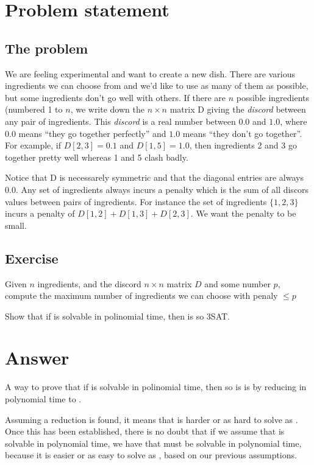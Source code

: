 \section*{Problem statement}
\subsection*{The \exc{} problem}
We are feeling experimental and want to create a new dish. There are various ingredients we can choose from and we'd like to use as many of them as possible, but some ingredients don't go well with others. If there are $n$ possible ingredients (numbered 1 to $n$, we write down the $n\times n$ matrix D giving the \textit{discord} between any pair of ingredients. This \textit{discord} is a real number between $0.0$ and $1.0$, where $0.0$ means ``they go together perfectly'' and $1.0$ means ``they don't go together''. For example, if $D[2,3] = 0.1$ and $D[1,5] = 1.0$, then ingredients 2 and 3 go together pretty well whereas 1  and 5 clash badly.

Notice that D is necessarely symmetric and that the diagonal entries are always $0.0$. Any set of ingredients always incurs a penalty which is the sum of all discors values between pairs of ingredients. For instance the set of ingredients $\{1,2,3\}$ incurs a penalty of $D[1,2] + D[1,3] + D[2,3]$. We want the penalty to be small.

\subsection*{Exercise}
Given $n$ ingredients, and the discord $n \times n$ matrix $D$ and some number $p$, compute the maximum number of ingredients we can choose with penaly $\leq p$

Show that if \exc{} is solvable in polinomial time, then is so 3SAT.

\section*{Answer}
A way to prove that if \exc{} is solvable in polinomial time, then so is \tsat{} is by reducing in polynomial time \tsat{} to \exc{}.

Assuming a reduction is found, it means that \exc{} is harder or as hard to solve as \tsat{}. Once this has been established, there is no doubt that if we assume that \exc{} is solvable in polynomial time, we have that \tsat{} must be solvable in polynomial time, because it is easier or as easy to solve as \exc{}, based on our previous assumptions.


